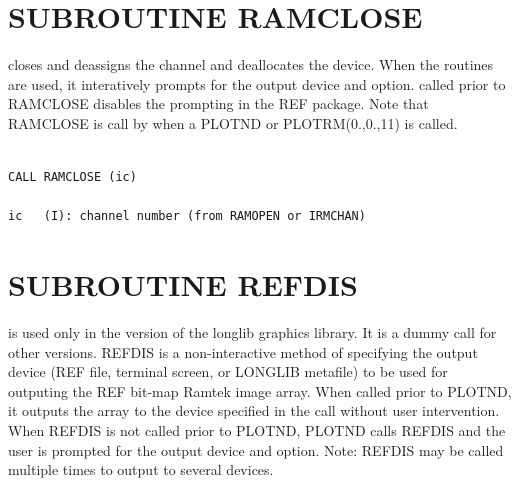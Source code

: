 \documentclass[11pt]{report}
\begin{document}
\section{SUBROUTINE RAMCLOSE}

 closes and deassigns the  channel and deallocates the device.
When the  routines are used, it interatively prompts for the output
device and option.   called prior to RAMCLOSE disables the prompting
in the REF package.  Note that RAMCLOSE is call by  when a
PLOTND or PLOTRM(0.,0.,11) is called.
\begin{verbatim}

CALL RAMCLOSE (ic)

ic   (I): channel number (from RAMOPEN or IRMCHAN)
\end{verbatim}


\section{SUBROUTINE REFDIS}

 is used only in the  version of the longlib graphics
library.  It is a dummy call for other versions.  REFDIS is a non-interactive
method of specifying the output device (REF file, terminal screen, or
LONGLIB metafile) to be used for outputing the REF bit-map Ramtek image array.
When called prior to PLOTND, it outputs the array to the device
specified in the call without user intervention.
When REFDIS is not called prior to PLOTND, PLOTND calls REFDIS and
the user is prompted for the output device and option.
Note: REFDIS may be called multiple times to output to several devices.
\end{document}
